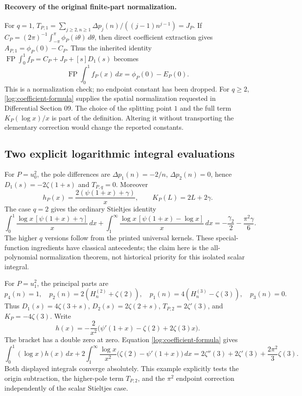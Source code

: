 \paragraph{Recovery of the original finite-part normalization.}
For $q=1$, $T_{P,1}=\sum_{j\ge2,n\ge1}
\Delta p_j(n)/((j-1)n^{j-1})=J_P$.
If $C_P=(2\pi)^{-1}\int_{-\pi}^{\pi}\phi_P(i\theta)\,d\theta$,
then direct coefficient extraction gives
$A_{P,1}=\phi_P(0)-C_P$.
Thus the inherited identity
$\operatorname{FP}\int_0^1 f_P=C_P+J_P+[s]D_1(s)$ becomes
\begin{equation}\label{log:fpcheck}
 \operatorname{FP}\int_0^1f_P(x)\,dx=\phi_P(0)-E_P(0).
\end{equation}
This is a normalization check; no endpoint constant has been dropped.
For $q\ge2$, \eqref{log:coefficient-formula} supplies the spatial
normalization requested in Differential Section 09. The choice of the
splitting point $1$ and the full term $K_P(\log x)/x$ is part of the
definition. Altering it without transporting the elementary correction
would change the reported constants.

\subsection{Two explicit logarithmic integral evaluations}

For $P=u_0^2$, the pole differences are
$\Delta p_1(n)=-2/n$, $\Delta p_2(n)=0$, hence
$D_1(s)=-2\zeta(1+s)$ and $T_{P,q}=0$.
Moreover
\[
 h_P(x)=\frac{2(\psi(1+x)+\gamma)}x,\qquad
 K_P(L)=2L+2\gamma.
\]
The case $q=2$ gives the ordinary Stieltjes identity
\begin{equation}\label{log:gamma2}
 \boxed{\displaystyle
 \int_0^1\frac{\log x\,[\psi(1+x)+\gamma]}x\,dx
 +\int_1^\infty\frac{\log x\,[\psi(1+x)-\log x]}x\,dx
 =-\frac{\gamma_2}{2}-\frac{\pi^2\gamma}{6}.}
\end{equation}
The higher $q$ versions follow from the printed universal kernels.
These special-function ingredients have classical antecedents; the
claim here is the all-polynomial normalization theorem, not historical
priority for this isolated scalar integral.

For $P=u_1^2$, the principal parts are
\[
 p_4(n)=1,\quad p_2(n)=2(H_n^{(2)}+\zeta(2)),\quad
 p_1(n)=4(H_n^{(3)}-\zeta(3)),\quad p_3(n)=0.
\]
Thus $D_1(s)=4\zeta(3+s)$, $D_2(s)=2\zeta(2+s)$,
$T_{P,2}=2\zeta'(3)$, and $K_P=-4\zeta(3)$.
Write
\[
 h(x)=-\frac{2}{x^2}
        \bigl(\psi'(1+x)-\zeta(2)+2\zeta(3)x\bigr).
\]
The bracket has a double zero at zero. Equation
\eqref{log:coefficient-formula} gives
\begin{equation}\label{log:trigamma-square}
 \boxed{\displaystyle
 \int_0^1(\log x)h(x)\,dx
 +2\int_1^\infty\frac{\log x}{x^2}
          \bigl(\zeta(2)-\psi'(1+x)\bigr)\,dx
 =2\zeta''(3)+2\zeta'(3)+\frac{2\pi^2}{3}\zeta(3).}
\end{equation}
Both displayed integrals converge absolutely. This example explicitly
tests the origin subtraction, the higher-pole term $T_{P,2}$, and the
$\pi^2$ endpoint correction independently of the scalar Stieltjes case.
